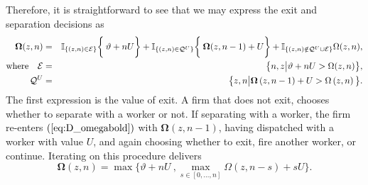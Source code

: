 Therefore, it is straightforward to see that we may express the exit and separation decisions as
\begin{eqnarray}
\bm{\Omega }(z,n)&=& \mathbb{I}_{\{(z,n)\in\mathcal{E}\}} \bigg\{%
\:\vartheta +nU \bigg\} + \mathbb{I}_{\{(z,n)\in\mathcal{Q}^U\}}\bigg\{\:%
\bm{\Omega}(z,n-1)+U\bigg\} +  \mathbb{I}_{\{(z,n)\notin \mathcal{Q}^U\cup%
\mathcal{E}\}}\Omega(z,n),  \label{eq:D_omegabold} \\
\text{where}\quad\mathcal{E} &=&\big\{n,z\big|\vartheta +nU> {\Omega }(z,n)%
\big\},  \notag \\
\mathcal{Q}^{U}&=&\big\{ z,n\big|\bm{\Omega }\left(z,n-1\right)+U
>\Omega\left( z,n\right)\big\}.  \notag
\end{eqnarray}
The first expression is the value of exit. A firm that does not exit,
chooses whether to separate with a worker or not. If separating with a
worker, the firm re-enters $(\ref{eq:D_omegabold})$ with $\bm{\Omega}%
(z,n-1)$, having dispatched with a worker with value $U$, and again choosing
whether to exit, fire another worker, or continue. Iterating on this
procedure delivers
\begin{equation}  \label{eq:D_omegabold2}
\bm{\Omega }(z,n)= \max \bigg\{\vartheta +nU\:, \max_{s\in[0,\dots,n]%
}\Omega(z,n-s)+sU \bigg\}.
\end{equation}

